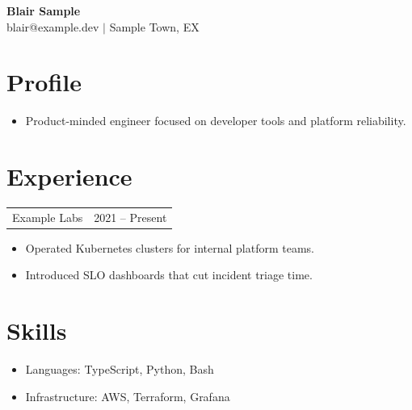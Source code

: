 \documentclass[11pt]{article}
\begin{document}
\begin{center}
  {\Large\bfseries Blair Sample}\\
  blair@example.dev $|$ Sample Town, EX
\end{center}

\section*{Profile}
\begin{itemize}[leftmargin=*]
  \item Product-minded engineer focused on developer tools and platform reliability.
\end{itemize}

\section*{Experience}
\begin{tabularx}{\textwidth}{@{}X r@{}}
  Example Labs & 2021 -- Present \\
\end{tabularx}
\begin{itemize}[leftmargin=*]
  \item Operated Kubernetes clusters for internal platform teams.
  \item Introduced SLO dashboards that cut incident triage time.
\end{itemize}

\section*{Skills}
\begin{itemize}[leftmargin=*]
  \item Languages: TypeScript, Python, Bash
  \item Infrastructure: AWS, Terraform, Grafana
\end{itemize}
\end{document}
